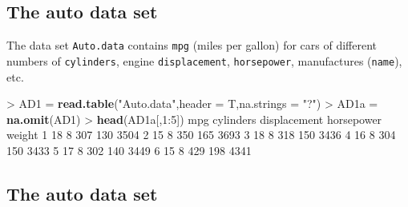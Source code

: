 \documentclass[]{article}
\newenvironment{Shaded}{\begin{snugshade}}{\end{snugshade}}
\newcommand{\KeywordTok}[1]{\textcolor[rgb]{0.13,0.29,0.53}{\textbf{{#1}}}}
\newcommand{\DataTypeTok}[1]{\textcolor[rgb]{0.13,0.29,0.53}{{#1}}}
\newcommand{\DecValTok}[1]{\textcolor[rgb]{0.00,0.00,0.81}{{#1}}}
\newcommand{\StringTok}[1]{\textcolor[rgb]{0.31,0.60,0.02}{{#1}}}
\newcommand{\NormalTok}[1]{{#1}}
\begin{document}
\subsection{The auto data set}\label{the-auto-data-set}

The data set \texttt{Auto.data} contains \texttt{mpg} (miles per gallon)
for cars of different numbers of \texttt{cylinders}, engine
\texttt{displacement}, \texttt{horsepower}, manufactures
(\texttt{name}), etc.

\begin{Shaded}
\begin{Highlighting}[]
\NormalTok{>}\StringTok{ }\NormalTok{AD1 =}\StringTok{ }\KeywordTok{read.table}\NormalTok{(}\StringTok{"Auto.data"}\NormalTok{,}\DataTypeTok{header =} \NormalTok{T,}\DataTypeTok{na.strings =} \StringTok{"?"}\NormalTok{)}
\NormalTok{>}\StringTok{ }\NormalTok{AD1a =}\StringTok{ }\KeywordTok{na.omit}\NormalTok{(AD1)}
\NormalTok{>}\StringTok{ }\KeywordTok{head}\NormalTok{(AD1a[,}\DecValTok{1}\NormalTok{:}\DecValTok{5}\NormalTok{])}
  \NormalTok{mpg cylinders displacement horsepower weight}
\DecValTok{1}  \DecValTok{18}         \DecValTok{8}          \DecValTok{307}        \DecValTok{130}   \DecValTok{3504}
\DecValTok{2}  \DecValTok{15}         \DecValTok{8}          \DecValTok{350}        \DecValTok{165}   \DecValTok{3693}
\DecValTok{3}  \DecValTok{18}         \DecValTok{8}          \DecValTok{318}        \DecValTok{150}   \DecValTok{3436}
\DecValTok{4}  \DecValTok{16}         \DecValTok{8}          \DecValTok{304}        \DecValTok{150}   \DecValTok{3433}
\DecValTok{5}  \DecValTok{17}         \DecValTok{8}          \DecValTok{302}        \DecValTok{140}   \DecValTok{3449}
\DecValTok{6}  \DecValTok{15}         \DecValTok{8}          \DecValTok{429}        \DecValTok{198}   \DecValTok{4341}
\end{Highlighting}
\end{Shaded}

\subsection{The auto data set}\label{the-auto-data-set-1}
\end{document}
